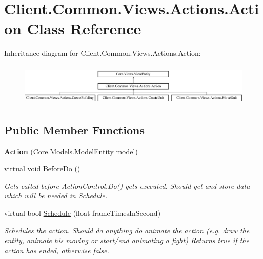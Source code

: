 \hypertarget{classClient_1_1Common_1_1Views_1_1Actions_1_1Action}{\section{Client.\-Common.\-Views.\-Actions.\-Action Class Reference}
\label{classClient_1_1Common_1_1Views_1_1Actions_1_1Action}
}
Inheritance diagram for Client.\-Common.\-Views.\-Actions.\-Action\-:\begin{figure}[H]
\begin{center}
\leavevmode
\includegraphics[height=2.036364cm]{classClient_1_1Common_1_1Views_1_1Actions_1_1Action}
\end{center}
\end{figure}
\subsection*{Public Member Functions}
\begin{DoxyCompactItemize}
\item 
\hypertarget{classClient_1_1Common_1_1Views_1_1Actions_1_1Action_ae6ccd18f995bf709877f508c65308c42}{{\bfseries Action} (\hyperlink{classCore_1_1Models_1_1ModelEntity}{Core.\-Models.\-Model\-Entity} model)}\label{classClient_1_1Common_1_1Views_1_1Actions_1_1Action_ae6ccd18f995bf709877f508c65308c42}

\item 
virtual void \hyperlink{classClient_1_1Common_1_1Views_1_1Actions_1_1Action_ad129f8cb1d8079f76d8199dbc80d3c0d}{Before\-Do} ()
\begin{DoxyCompactList}\small\item\em Gets called before Action\-Control.\-Do() gets executed. Should get and store data which will be needed in Schedule. \end{DoxyCompactList}\item 
virtual bool \hyperlink{classClient_1_1Common_1_1Views_1_1Actions_1_1Action_a92fdf89fb39016ef84e08dc3c7352d51}{Schedule} (float frame\-Times\-In\-Second)
\begin{DoxyCompactList}\small\item\em Schedules the action. Should do anything do animate the action (e.\-g. draw the entity, animate his moving or start/end animating a fight) Returns true if the action has ended, otherwise false. \end{DoxyCompactList}\end{DoxyCompactItemize}
